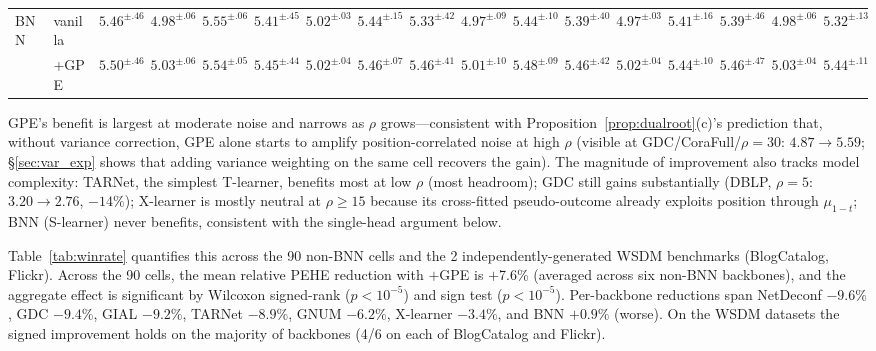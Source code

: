 \documentclass[sigconf,anonymous,review]{acmart}
\begin{document}
\begin{table}[t]
\begin{tabular}{@{}l l ccc ccc ccc ccc ccc@{}}
\midrule
\multirow{2}{*}{BNN} & vanilla & $5.46^{\pm.46}$ & $4.98^{\pm.06}$ & $5.55^{\pm.06}$ & $5.41^{\pm.45}$ & $5.02^{\pm.03}$ & $5.44^{\pm.15}$ & $5.33^{\pm.42}$ & $4.97^{\pm.09}$ & $5.44^{\pm.10}$ & $5.39^{\pm.40}$ & $4.97^{\pm.03}$ & $5.41^{\pm.16}$ & $5.39^{\pm.46}$ & $4.98^{\pm.06}$ & $5.32^{\pm.13}$ \\
 & +GPE & $5.50^{\pm.46}$ & $5.03^{\pm.06}$ & $5.54^{\pm.05}$ & $5.45^{\pm.44}$ & $5.02^{\pm.04}$ & $5.46^{\pm.07}$ & $5.46^{\pm.41}$ & $5.01^{\pm.10}$ & $5.48^{\pm.09}$ & $5.46^{\pm.42}$ & $5.02^{\pm.04}$ & $5.44^{\pm.10}$ & $5.46^{\pm.47}$ & $5.03^{\pm.04}$ & $5.44^{\pm.11}$ \\
\bottomrule
\end{tabular}
\end{table}

GPE's benefit is largest at moderate noise and narrows as $\rho$ grows---consistent with Proposition~\ref{prop:dualroot}(c)'s prediction that, without variance correction, GPE alone starts to amplify position-correlated noise at high $\rho$ (visible at GDC/CoraFull/$\rho{=}30$: $4.87\to5.59$; §\ref{sec:var_exp} shows that adding variance weighting on the same cell recovers the gain). The magnitude of improvement also tracks model complexity: TARNet, the simplest T-learner, benefits most at low $\rho$ (most headroom); GDC still gains substantially (DBLP, $\rho{=}5$: $3.20\to2.76$, $-14\%$); X-learner is mostly neutral at $\rho\geq 15$ because its cross-fitted pseudo-outcome already exploits position through $\mu_{1-t}$; BNN (S-learner) never benefits, consistent with the single-head argument below.

Table~\ref{tab:winrate} quantifies this across the 90 non-BNN cells and the 2 independently-generated WSDM benchmarks (BlogCatalog, Flickr). Across the 90 cells, the mean relative PEHE reduction with $+$GPE is $+$7.6\% (averaged across six non-BNN backbones), and the aggregate effect is significant by Wilcoxon signed-rank ($p<10^{-5}$) and sign test ($p<10^{-5}$). Per-backbone reductions span NetDeconf $-9.6\%$, GDC $-9.4\%$, GIAL $-9.2\%$, TARNet $-8.9\%$, GNUM $-6.2\%$, X-learner $-3.4\%$, and BNN $+0.9\%$ (worse). On the WSDM datasets the signed improvement holds on the majority of backbones (4/6 on each of BlogCatalog and Flickr).
\end{document}
